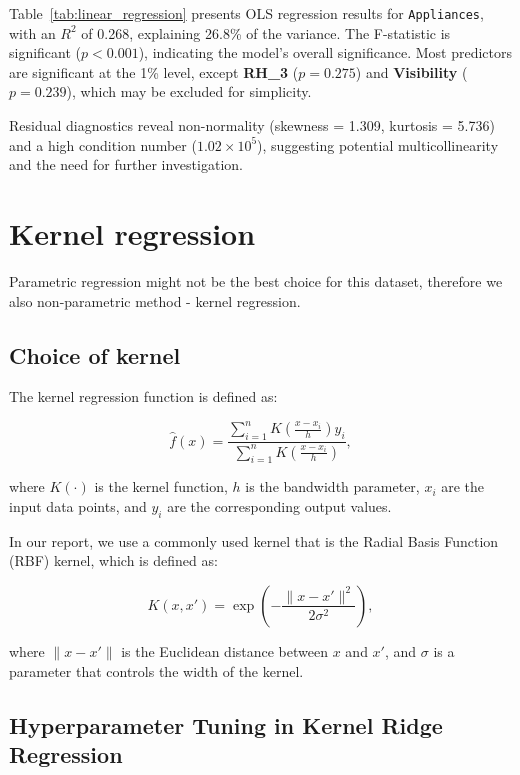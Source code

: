 \documentclass[12pt]{article}
\begin{document}
Table~\ref{tab:linear_regression} presents OLS regression results for \texttt{Appliances},
 with an $R^2$ of 0.268, explaining 26.8\% of the variance. The F-statistic is significant 
 ($p < 0.001$), indicating the model's overall significance. Most predictors are significant at 
 the 1\% level, except \textbf{RH\_3} ($p = 0.275$) and \textbf{Visibility} ($p = 0.239$), which may be excluded for simplicity.

Residual diagnostics reveal non-normality (skewness = 1.309, kurtosis = 5.736) and a 
high condition number ($1.02 \times 10^5$), suggesting potential multicollinearity and the need for further investigation.

\section{Kernel regression}
Parametric regression might not be the best choice for this dataset, 
therefore we also non-parametric method - kernel regression.

\subsection{Choice of kernel}
The kernel regression function is defined as:

\[
\hat{f}(x) = \frac{\sum_{i=1}^n K\left(\frac{x - x_i}{h}\right) y_i}{\sum_{i=1}^n K\left(\frac{x - x_i}{h}\right)},
\]

where \( K(\cdot) \) is the kernel function, \( h \) is the bandwidth parameter, \( x_i \) are the input data points, and \( y_i \) are the corresponding output values.

In our report, we use a commonly used kernel that is the Radial Basis Function (RBF) kernel, which is defined as:

\[
K(x, x') = \exp\left(-\frac{\|x - x'\|^2}{2\sigma^2}\right),
\]

where \( \|x - x'\| \) is the Euclidean distance between \( x \) and \( x' \), and \( \sigma \) is a parameter that controls the width of the kernel.

\subsection{Hyperparameter Tuning in Kernel Ridge Regression}
\end{document}
